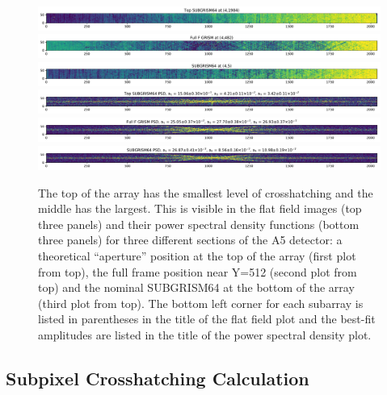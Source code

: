 \documentclass{aastex62}
\begin{document}
\begin{figure}[!hbtp]
\centering
\includegraphics[width=0.99\columnwidth]{subg_pos_topGrism64.pdf}\\
\includegraphics[width=0.99\columnwidth]{subg_pos_fullfGrismRegion.pdf}\\
\includegraphics[width=0.99\columnwidth]{subg_pos_subgrism64.pdf}\\
\vspace{0.2in}
\includegraphics[width=0.99\columnwidth]{subg_pos_topGrism64_psd.pdf}\\
\includegraphics[width=0.99\columnwidth]{subg_pos_fullfGrismRegion_psd.pdf}\\
\includegraphics[width=0.99\columnwidth]{subg_pos_subgrism64_psd.pdf}\\
\caption{
The top of the array has the smallest level of crosshatching and the middle has the largest.
This is visible in the flat field images (top three panels) and their power spectral density functions (bottom three panels) for three different sections of the A5 detector: a theoretical ``aperture'' position at the top of the array (first plot from top), the full frame position near Y=512 (second plot from top) and the nominal SUBGRISM64 at the bottom of the array (third plot from top).
The bottom left corner for each subarray is listed in parentheses in the title of the flat field plot and the best-fit amplitudes are listed in the title of the power spectral density plot.
 }\label{fig:subpixScanSimulation}
\end{figure}

\subsection{Subpixel Crosshatching Calculation}\label{sec:CrosshatchSim}
\end{document}
